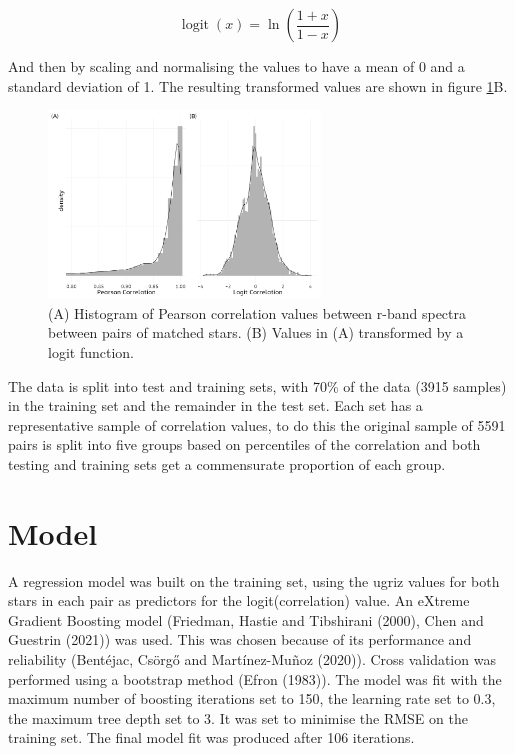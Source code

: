 \documentclass[a4paper,fleqn,usenatbib]{mnras}
\begin{document}
\begin{equation}
  \displaystyle \operatorname {logit} (x)=\ln \left({\frac {1+x}{1-x}}\right)
  \label{eq:logit}
\end{equation}

And then by scaling and normalising the values to have a mean of 0 and a
standard deviation of 1. The resulting transformed values are shown in
figure \ref{fig:histograms}B.

\begin{figure}
  \includegraphics[width=\columnwidth, height = 5cm]{figures/histograms}
    \caption{(A) Histogram of Pearson correlation values between r-band spectra between pairs of matched stars. (B) Values in (A) transformed by a logit function.}
    \label{fig:histograms}
\end{figure}

The data is split into test and training sets, with 70\% of the data
(3915 samples) in the training set and the remainder in the test set.
Each set has a representative sample of correlation values, to do this
the original sample of 5591 pairs is split into five groups based on
percentiles of the correlation and both testing and training sets get a
commensurate proportion of each group.

\hypertarget{model}{%
\section{Model}\label{model}}

A regression model was built on the training set, using the ugriz values
for both stars in each pair as predictors for the logit(correlation)
value. An eXtreme Gradient Boosting model (Friedman, Hastie and
Tibshirani (2000), Chen and Guestrin (2021)) was used. This was chosen
because of its performance and reliability (Bentéjac, Csörgő and
Martínez-Muñoz (2020)). Cross validation was performed using a bootstrap
method (Efron (1983)). The model was fit with the maximum number of
boosting iterations set to 150, the learning rate set to 0.3, the
maximum tree depth set to 3. It was set to minimise the RMSE on the
training set. The final model fit was produced after 106 iterations.
\end{document}
